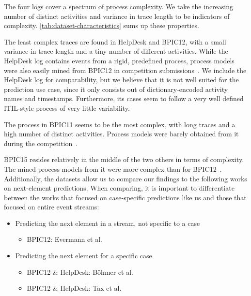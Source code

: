 The four logs cover a spectrum of process complexity.
We take the increasing number of distinct activities and variance in trace length to be indicators of complexity.
\autoref{tab:dataset-characteristics} sums up these properties.

The least complex traces are found in HelpDesk and BPIC12, with a small variance in trace length and a tiny number of different activities. While the HelpDesk log contains events from a rigid, predefined process, process models were also easily mined from BPIC12 in competition submissions~\cite{adriansyah2012mining}.
We include the HelpDesk log for comparability, but we believe that it is not well suited for the prediction use case, since it only consists out of dictionary-encoded activity names and timestamps. Furthermore, its cases seem to follow a very well defined ITIL-style process of very little variability.

The process in BPIC11 seems to be the most complex, with long traces and a high number of distinct activities. Process models were barely obtained from it during the competition~\cite{bose2011analysis}.

BPIC15 resides relatively in the middle of the two others in terms of complexity. The mined process models from it were more complex than for BPIC12~\cite{van2015benchmarking}.\\

\noindent Additionally, the datasets allow us to compare our findings to the following works on next-element predictions. When comparing, it is important to differentiate between the works that focused on case-specific predictions like us and those that focused on entire event streams:

\begin{itemize}
    \item Predicting the next element in a stream, not specific to a case
    \begin{itemize}
        \item BPIC12: Evermann et al.~\cite{evermann2016}
    \end{itemize}
    \item Predicting the next element for a specific case
    \begin{itemize}
        \item BPIC12 \& HelpDesk: Böhmer et al.~\cite{boehmer2018probability}
        \item BPIC12 \& HelpDesk: Tax et al.~\cite{tax2017}
    \end{itemize}
\end{itemize}

